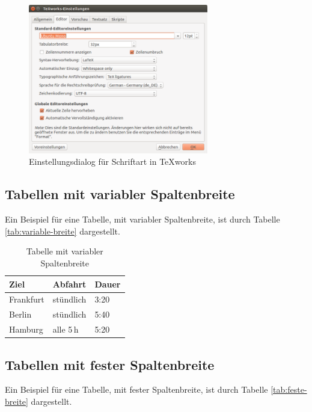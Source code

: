 \begin{figure}
	\centering
	\includegraphics[width=0.7\textwidth]{bilder/einstellungen-schriftart.png}
	\caption{Einstellungsdialog für Schriftart in TeXworks}
	\label{fig:einstellungen-schriftart}
\end{figure}


\subsection{Tabellen mit variabler Spaltenbreite}

Ein Beispiel für eine Tabelle, mit variabler Spaltenbreite, ist durch Tabelle \vref{tab:variable-breite} dargestellt.

\begin{table}[htbp]
\centering
\begin{tabular}{l l l}
\toprule
Ziel            & Abfahrt      & Dauer \\
\midrule
Frankfurt       & stündlich    & 3:20 \\
Berlin          & stündlich    & 5:40 \\
Hamburg         & alle 5\,h    & 5:20 \\
\bottomrule
\end{tabular}
\caption{Tabelle mit variabler Spaltenbreite}
\label{tab:variable-breite}
\end{table}


\subsection{Tabellen mit fester Spaltenbreite}

Ein Beispiel für eine Tabelle, mit fester Spaltenbreite, ist durch Tabelle \vref{tab:feste-breite} dargestellt.

